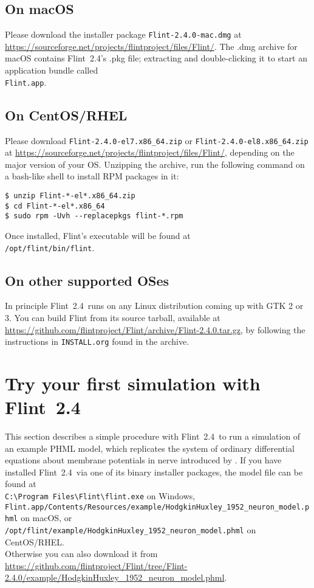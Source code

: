 \documentclass[a4paper,10pt]{report}
\def\FlintVersion{2.4}
\def\FlintLongVersion{2.4.0}
\def\Flint{Flint~\FlintVersion}
\def\FlintFilenamePrefix{Flint-\FlintLongVersion}
\newcommand{\filename}[1]{{\tt #1}}
\begin{document}
\subsection{On macOS}
Please download the installer package \filename{\FlintFilenamePrefix-mac.dmg} at
\url{https://sourceforge.net/projects/flintproject/files/Flint/}.
The .dmg archive for macOS contains \Flint's .pkg file; extracting and
double-clicking it to start an application bundle called\\
\filename{Flint.app}.

\subsection{On CentOS/RHEL}
Please download \filename{\FlintFilenamePrefix-el7.x86\_64.zip} or
\filename{\FlintFilenamePrefix-el8.x86\_64.zip}
at \url{https://sourceforge.net/projects/flintproject/files/Flint/}, depending
on the major version of your OS.
Unzipping the archive, run the following command on a bash-like shell to install
RPM packages in it:
\begin{verbatim}
$ unzip Flint-*-el*.x86_64.zip
$ cd Flint-*-el*.x86_64
$ sudo rpm -Uvh --replacepkgs flint-*.rpm
\end{verbatim}
Once installed, Flint's executable will be found at\\
\filename{/opt/flint/bin/flint}.

\subsection{On other supported OSes}
In principle \Flint\ runs on any Linux distribution coming up with GTK 2 or 3.
You can build Flint from its source tarball, available at
\url{https://github.com/flintproject/Flint/archive/\FlintFilenamePrefix.tar.gz},
by following the instructions in \filename{INSTALL.org} found in the archive.

\section{Try your first simulation with \Flint}
This section describes a simple procedure with \Flint\ to run a simulation of an
example PHML model, which replicates the system of ordinary differential
equations about membrane potentials in nerve introduced by
\cite{hodgkin_quantitative_1952}.
If you have installed \Flint\ via one of its binary installer packages, the
model file can be found at\\
\filename{C:\textbackslash Program Files\textbackslash Flint\textbackslash  flint.exe}
on Windows,\\
\filename{Flint.app/Contents/Resources/example/HodgkinHuxley\_1952\_neuron\_model.phml}
on macOS, or\\
\filename{/opt/flint/example/HodgkinHuxley\_1952\_neuron\_model.phml} on CentOS/RHEL.\\
Otherwise you can also download it from\\
\url{https://github.com/flintproject/Flint/tree/\FlintFilenamePrefix/example/HodgkinHuxley\_1952\_neuron\_model.phml}.
\end{document}
